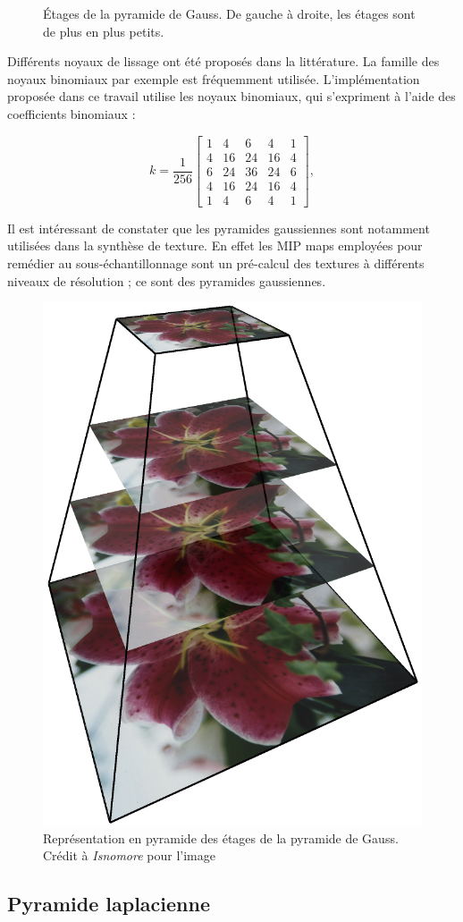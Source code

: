 \begin{figure}[h]
    \caption[Étages de la pyramide de Gauss]{Étages de la pyramide de Gauss. De gauche à droite, les étages sont de plus en plus petits.}
    \label{fig:gaussian-pyramid}
\end{figure}

Différents noyaux de lissage ont été proposés dans la littérature. La famille des noyaux binomiaux par exemple est fréquemment utilisée. L'implémentation proposée dans ce travail utilise les noyaux binomiaux, qui s'expriment à l'aide des coefficients binomiaux :

\begin{equation}
    k = \frac{1}{256}\left[
        \begin{array}{ccccccc}
            1 & 4 & 6 & 4 & 1 \\
            4 & 16 & 24 & 16 & 4 \\
            6 & 24 & 36 & 24 & 6 \\
            4 & 16 & 24 & 16 & 4 \\
            1 & 4 & 6 & 4 & 1
        \end{array}
    \right],
\end{equation}

Il est intéressant de constater que les pyramides gaussiennes sont notamment utilisées dans la synthèse de texture. En effet les MIP maps employées pour remédier au sous-échantillonnage sont un pré-calcul des textures à différents niveaux de résolution ; ce sont des pyramides gaussiennes.

\begin{figure}
    \centering
    \includegraphics[width=.25\textwidth]{contenu/resources/images/image_pyramid_placeholder}
    \caption[Représentation pyramidale des étages de la pyramide de Gauss]{Représentation en pyramide des étages de la pyramide de Gauss. Crédit à \textit{Isnomore} pour l'image}
    \label{fig:pyramid-gauss}
\end{figure}

\subsection{Pyramide laplacienne}

